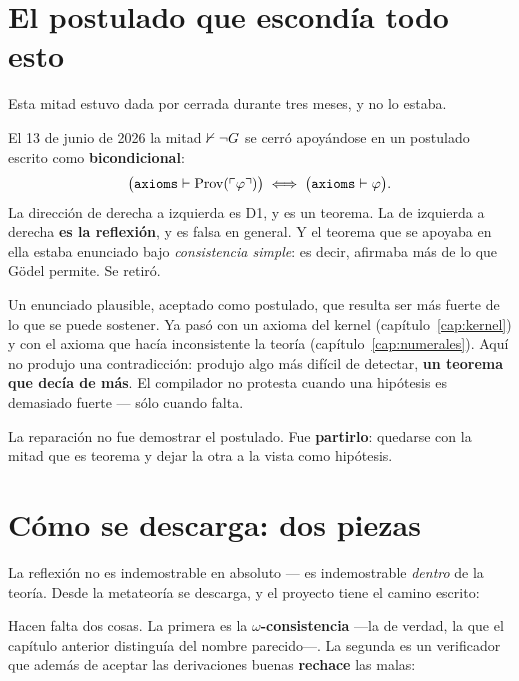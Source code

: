 \section{El postulado que escondía todo esto}

Esta mitad estuvo dada por cerrada durante tres meses, y no lo estaba.

\begin{refutado}
El 13 de junio de 2026 la mitad $\nvdash\lnot G$ se cerró apoyándose en un postulado escrito
como \textbf{bicondicional}:
\[ \bigl(\text{\ident{axioms}} \derives \Prov(\codigo{\varphi})\bigr)
   \;\Longleftrightarrow\;
   \bigl(\text{\ident{axioms}} \derives \varphi\bigr). \]
La dirección de derecha a izquierda es D1, y es un teorema. La de izquierda a derecha \textbf{es la
reflexión}, y es falsa en general. Y el teorema que se apoyaba en ella estaba enunciado bajo
\emph{consistencia simple}: es decir, afirmaba más de lo que Gödel permite. Se retiró.
\end{refutado}

\begin{leccion}
Un enunciado plausible, aceptado como postulado, que resulta ser más fuerte de lo que se puede
sostener. Ya pasó con un axioma del kernel (capítulo~\ref{cap:kernel}) y con el axioma que hacía
inconsistente la teoría (capítulo~\ref{cap:numerales}). Aquí no produjo una contradicción: produjo
algo más difícil de detectar, \textbf{un teorema que decía de más}. El compilador no protesta
cuando una hipótesis es demasiado fuerte — sólo cuando falta.

La reparación no fue demostrar el postulado. Fue \textbf{partirlo}: quedarse con la mitad que es
teorema y dejar la otra a la vista como hipótesis.
\end{leccion}

\section{Cómo se descarga: dos piezas}

La reflexión no es indemostrable en absoluto — es indemostrable \emph{dentro} de la teoría. Desde
la metateoría se descarga, y el proyecto tiene el camino escrito:


Hacen falta dos cosas. La primera es la \textbf{$\omega$-consistencia} —la de verdad, la que el
capítulo anterior distinguía del nombre parecido—. La segunda es un verificador que además de
aceptar las derivaciones buenas \textbf{rechace} las malas:

